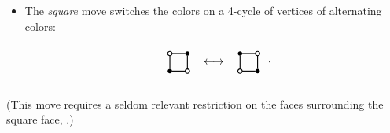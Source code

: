 \documentclass[ALCO,ThmDefs,Unicode,epreuves,published]{cedram}
\begin{document}
\begin{definition}
\begin{itemize}
\[\begin{picture}
\put(20,12.5){\line(0,1){15}}
\put(20,10){\circle{5}}
\put(20,30){\circle{5}}
\end{picture}
\begin{picture}(40,40)(0,0)
\thicklines
\put(20,20){\makebox(0,0){$\longleftrightarrow$}}
\end{picture}
\begin{picture}(40,40)(0,0)
\thicklines
\put(0,0){\line(1,2){9}}
\put(40,40){\line(-1,-2){9}}
\put(40,0){\line(-1,2){9}}
\put(0,40){\line(1,-2){9}}
\put(12.5,20){\line(1,0){15}}
\put(10,20){\circle{5}}
\put(30,20){\circle{5}}
\put(42,20){.}
\end{picture}
\]

\item The \emph{square} move switches the colors on a 4-cycle of
 vertices of alternating colors:
\[
\setlength{\unitlength}{0.8pt}
\begin{picture}(40,45)(0,0)
\thicklines
\put(0,0){\line(1,1){8.5}}
\put(40,40){\line(-1,-1){8.5}}
\put(0,40){\line(1,-1){8.5}}
\put(40,0){\line(-1,1){8.5}}
\put(10,12.5){\line(0,1){15}}
\put(30,12.5){\line(0,1){15}}
\put(12.5,10){\line(1,0){15}}
\put(12.5,30){\line(1,0){15}}
\put(10,10){\circle*{5}}
\put(10,30){\circle{5}}
\put(30,10){\circle{5}}
\put(30,30){\circle*{5}}
\end{picture}
\begin{picture}(40,40)(0,0)
\thicklines
\put(20,20){\makebox(0,0){$\longleftrightarrow$}}
\end{picture}
\begin{picture}(40,40)(0,0)
\thicklines
\put(0,0){\line(1,1){8.5}}
\put(40,40){\line(-1,-1){8.5}}
\put(0,40){\line(1,-1){8.5}}
\put(40,0){\line(-1,1){8.5}}
\put(10,12.5){\line(0,1){15}}
\put(30,12.5){\line(0,1){15}}
\put(12.5,10){\line(1,0){15}}
\put(12.5,30){\line(1,0){15}}
\put(10,10){\circle{5}}
\put(10,30){\circle*{5}}
\put(30,10){\circle*{5}}
\put(30,30){\circle{5}}
\put(42,20){.}
\end{picture}
\]
\end{itemize}
(This move requires a seldom relevant restriction on the faces surrounding the square face, 
\cf \cite[Restriction~6.3]{FPST}.) 
\end{definition}
\end{document}

